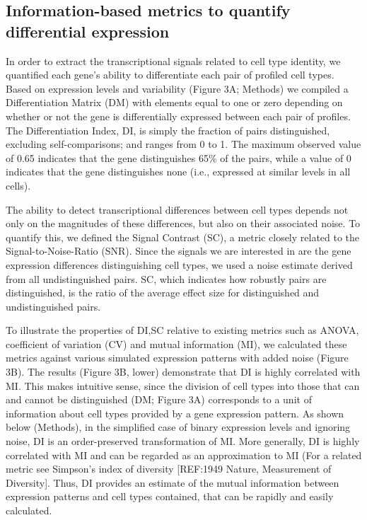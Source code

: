 \subsection{Information-based metrics to quantify differential expression}
In order to extract the transcriptional signals related to cell type identity, we quantified each gene's ability to differentiate each pair of profiled cell types. Based on expression levels and variability (Figure 3A; Methods) we compiled a Differentiation Matrix (DM) with elements equal to one or zero depending on whether or not the gene is differentially expressed between each pair of profiles. The Differentiation Index, DI, is simply the fraction of pairs distinguished, excluding self-comparisons; and ranges from 0 to 1. The maximum observed value of 0.65 indicates that the gene distinguishes 65\% of the pairs, while a value of 0 indicates that the gene distinguishes none (i.e., expressed at similar levels in all cells). 

The ability to detect transcriptional differences between cell types depends not only on the magnitudes of these differences, but also on their associated noise. To quantify this, we defined the Signal Contrast (SC), a metric closely related to the Signal-to-Noise-Ratio (SNR). Since the signals we are interested in are the gene expression differences distinguishing cell types, we used a noise estimate derived from all undistinguished pairs. SC, which indicates how robustly pairs are distinguished, is the ratio of the average effect size for distinguished and undistinguished pairs. 

To illustrate the properties of DI,SC relative to existing metrics such as ANOVA, coefficient of variation (CV) and mutual information (MI), we calculated these metrics against various simulated expression patterns with added noise (Figure 3B). The results (Figure 3B, lower) demonstrate that DI is highly correlated with MI. This makes intuitive sense, since the division of cell types into those that can and cannot be distinguished (DM; Figure 3A) corresponds to a unit of information about cell types provided by a gene expression pattern. As shown below (Methods), in the simplified case of binary expression levels and ignoring noise, DI is an order-preserved transformation of MI. More generally, DI is highly correlated with MI and can be regarded as an approximation to MI (For a related metric see Simpson's index of diversity [REF:1949 Nature, Measurement of Diversity]. Thus, DI provides an estimate of the mutual information between expression patterns and cell types contained, that can be rapidly and easily calculated. 

